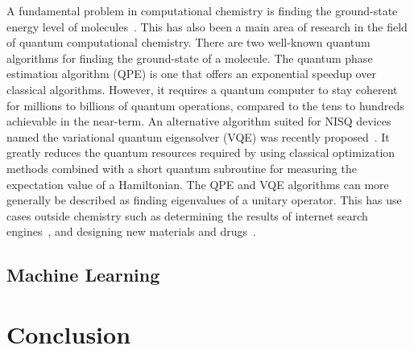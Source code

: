\documentclass[twocolumn, switch]{article}
\begin{document}
    A fundamental problem in computational chemistry is finding the ground-state energy level of molecules~\cite{aspuru2005simulated}.
    This has also been a main area of research in the field of quantum computational chemistry.
    There are two well-known quantum algorithms for finding the ground-state of a molecule.
    The quantum phase estimation algorithm (QPE) is one that offers an exponential speedup over classical algorithms.
    However, it requires a quantum computer to stay coherent for millions to billions of quantum operations, compared to the tens to hundreds achievable in the near-term.
    An alternative algorithm suited for NISQ devices named the variational quantum eigensolver (VQE) was recently proposed~\cite{vqe}.
    It greatly reduces the quantum resources required by using classical optimization methods combined with a short quantum subroutine for measuring the expectation value of a Hamiltonian.
    The QPE and VQE algorithms can more generally be described as finding eigenvalues of a unitary operator.
    This has use cases outside chemistry such as determining the results of internet search engines~\cite{page1999pagerank}, and designing new materials and drugs~\cite{golub2000eigenvalue}.
    
    \subsection{Machine Learning}
    
    \section{Conclusion} \label{sec:conclusion}
    
    \printbibliography
\end{document}
